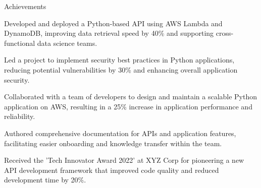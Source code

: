 \documentclass{resume} %
\begin{document}
    \begin{rSection}{Achievements}
        \begin{rSubsection}{}{}{}
                            \item Developed and deployed a Python{-}based API using AWS Lambda and DynamoDB, improving data retrieval speed by 40\% and supporting cross{-}functional data science teams.
                            \item Led a project to implement security best practices in Python applications, reducing potential vulnerabilities by 30\% and enhancing overall application security.
                            \item Collaborated with a team of developers to design and maintain a scalable Python application on AWS, resulting in a 25\% increase in application performance and reliability.
                            \item Authored comprehensive documentation for APIs and application features, facilitating easier onboarding and knowledge transfer within the team.
                            \item Received the 'Tech Innovator Award 2022' at XYZ Corp for pioneering a new API development framework that improved code quality and reduced development time by 20\%.
                    \end{rSubsection}
    \end{rSection}
\end{document}
